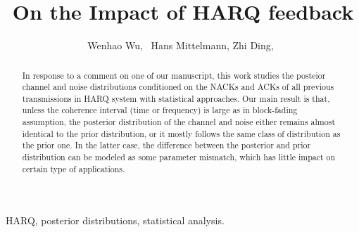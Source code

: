 \documentclass[journal,draftcls,onecolumn,12pt,twoside]{IEEEtran}
\begin{document}
%
\title{On the Impact of HARQ feedback}
%
%
%

\author{
  Wenhao Wu,~
  Hans Mittelmann,
  Zhi Ding,~
}

\maketitle

\begin{abstract}
  In response to a comment on one of our manuscript, this work studies the
  posteior channel and noise distributions conditioned on the NACKs and ACKs of
  all previous transmissions in HARQ system with statistical approaches. Our main
  result is that, unless the coherence interval (time or frequency) is large as
  in block-fading assumption, the posterior distribution of the channel and
  noise either remains almost identical to the prior distribution, or it mostly
  follows the same class of distribution as the prior one. In the latter case,
  the difference between the posterior and prior distribution can be modeled as
  some parameter mismatch, which has little impact on certain type of
  applications.
\end{abstract}

\begin{IEEEkeywords}
  HARQ, posterior distributions, statistical analysis.
\end{IEEEkeywords}
\end{document}
